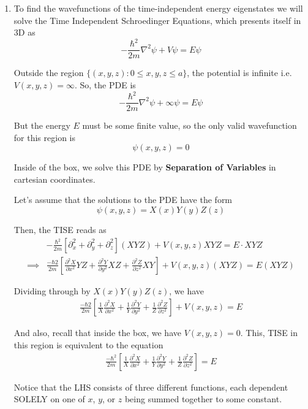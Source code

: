 \documentclass[twoside]{article}
\begin{document}
\begin{enumerate}[label=\alph*]
   \item To find the wavefunctions of the time-independent energy eigenstates we will solve the Time Independent Schroedinger Equations, which presents itself in 3D as 
   \[ -\frac{\hbar^2}{2m} \nabla^2 \psi + V\psi = E\psi\]

   Outside the region $\{ (x,y,z) : 0 \leq x,y,z \leq a \}$, the potential is infinite i.e. $V(x,y,z) = \infty$. So, the PDE is 
   \[ -\frac{\hbar^2}{2m} \nabla^2 \psi + \infty\psi = E\psi \]

   But the energy $E$ must be some finite value, so the only valid wavefunction for this region is
   \[ \boxed{\psi(x,y,z) = 0} \] 
   \vskip 0.5cm

   Inside of the box, we solve this PDE by \textbf{Separation of Variables} in cartesian coordinates.

   Let's assume that the solutions to the PDE have the form 
   \[ \psi(x,y,z) = X(x)Y(y)Z(z) \]

   Then, the TISE reads as 
   \begin{align*}
      &-\frac{\hbar^2}{2m} \left[ \partial_x^2 + \partial_y^2 + \partial_z^2 \right](XYZ) + V(x,y,z) XYZ = E \cdot XYZ \\
      \implies&\frac{-\hbar2}{2m} \left[ \frac{\partial^2 X}{\partial x^2} YZ +  \frac{\partial^2 Y}{\partial y^2} XZ +  \frac{\partial^2 Z}{\partial z^2} XY \right] + V(x,y,z) (XYZ) = E(XYZ)
   \end{align*}

   Dividing through by $X(x)Y(y)Z(z)$, we have 
   \begin{align*}
      \frac{-\hbar2}{2m} \left[ \frac{1}{X}\frac{\partial^2 X}{\partial x^2} +   \frac{1}{Y}\frac{\partial^2 Y}{\partial y^2}  +  \frac{1}{Z}\frac{\partial^2 Z}{\partial z^2}  \right] + V(x,y,z) = E
   \end{align*}

   And also, recall that inside the box, we have $V(x,y,z) = 0$. This, TISE in this region is equivalent to the equation 
   \begin{align*}
      \frac{-\hbar^2}{2m} \left[ \frac{1}{X}\frac{\partial^2 X}{\partial x^2} +   \frac{1}{Y}\frac{\partial^2 Y}{\partial y^2}  +  \frac{1}{Z}\frac{\partial^2 Z}{\partial z^2}  \right] = E
   \end{align*}
   
   Notice that the LHS consists of three different functions, each dependent SOLELY on one of $x$, $y$, or $z$ being summed together to some constant.


\end{enumerate}
\end{document}
